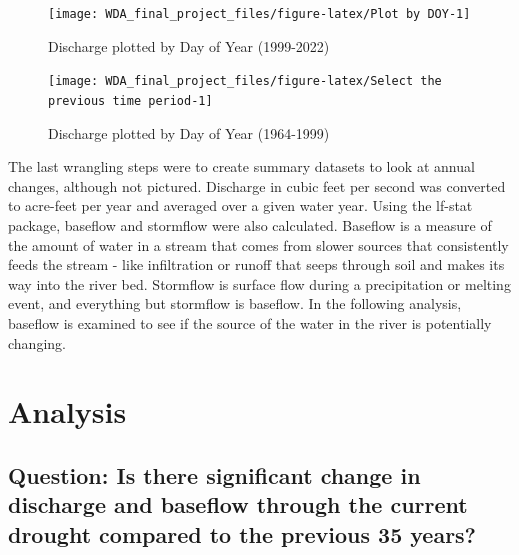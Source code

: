 \documentclass[
  12pt,
]{article}
\begin{document}
\begin{figure}

\texttt{[image: WDA\_final\_project\_files/figure-latex/Plot by DOY-1]} \hfill{}

\caption{Discharge plotted by Day of Year (1999-2022)}\label{fig:Plot by DOY}
\end{figure}

\begin{figure}

\texttt{[image: WDA\_final\_project\_files/figure-latex/Select the previous time period-1]} \hfill{}

\caption{Discharge plotted by Day of Year (1964-1999)}\label{fig:Select the previous time period}
\end{figure}

The last wrangling steps were to create summary datasets to look at
annual changes, although not pictured. Discharge in cubic feet per
second was converted to acre-feet per year and averaged over a given
water year. Using the lf-stat package, baseflow and stormflow were also
calculated. Baseflow is a measure of the amount of water in a stream
that comes from slower sources that consistently feeds the stream - like
infiltration or runoff that seeps through soil and makes its way into
the river bed. Stormflow is surface flow during a precipitation or
melting event, and everything but stormflow is baseflow. In the
following analysis, baseflow is examined to see if the source of the
water in the river is potentially changing.

\newpage

\hypertarget{analysis}{%
\section{Analysis}\label{analysis}}

\hypertarget{question-is-there-significant-change-in-discharge-and-baseflow-through-the-current-drought-compared-to-the-previous-35-years}{%
\subsection{Question: Is there significant change in discharge and
baseflow through the current drought compared to the previous 35
years?}\label{question-is-there-significant-change-in-discharge-and-baseflow-through-the-current-drought-compared-to-the-previous-35-years}}
\end{document}
